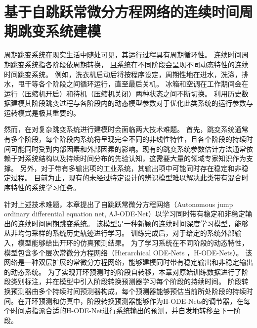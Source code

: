 
\chapter{基于自跳跃常微分方程网络的连续时间周期跳变系统建模}
周期跳变系统在现实生活中随处可见，其运行过程具有周期循环性。
连续时间周期跳变系统指各阶段依周期转换，
且系统在不同阶段会呈现不同动态特性的连续时间跳变系统。
例如，洗衣机启动后将按程序设定，周期性地在进水，洗涤，排水，甩干等各个阶段之间循环运行，直至最后关机。
冰箱和空调在工作期间会在运行（压缩机开启）和待机（压缩机关闭）两种状态之间不断切换。
利用历史数据建模其阶段跳变过程与各阶段内的动态模型参数对于优化此类系统的运行参数与运转模式是极其重要的。

然而，在对复杂跳变系统进行建模时会面临两大技术难题。
首先，跳变系统通常有多个阶段，每个阶段内系统将呈现完全不同的非线性特性，且各个阶段的持续时间可能同时受到内部因素和外部因素的影响\cite{WANG2022111790}。现有的跳变系统参数估计方法\cite{balenzuela2022parameter}通常依赖于对系统结构以及持续时间分布的先验认知，这需要大量的领域专家知识作为支撑。
另外，对于带有多输出项的工业系统，其输出项中可能同时存在稳定和非稳定过程\cite{nason2006stationary}。
目前为止，现有的未经过特定设计的辨识模型难以解决此类带有混合时序特性的系统学习任务。

针对上述技术难题，本章提出了自跳跃常微分方程网络（Autonomous jump ordinary differential equation net, AJ-ODE-Net）以学习同时带有稳定和非稳定输出的连续时间周期跳变系统。
该模型是一种新颖的连续时间深度学习模型，能够从非均匀采样的系统历史轨迹进行学习。
训练完成后，对于给定的系统外部输入，模型能够给出开环的仿真预测结果。
为了学习系统在不同阶段的动态特性，模型包含多个层次常微分方程网络（Hierarchical ODE-Nets ，H-ODE-Nets）。
该网络是一种双层扩展的常微分方程网络，能够建模同时带有稳定输出和非稳定输出的动态系统。
为了实现开环预测时的阶段自转移，本章对原始训练数据进行了阶段类别标注，并在模型中引入阶段转换预测器学习每个阶段的持续时间。
阶段转换预测器由多个持续时间预测器构成，每个预测器能够预估当前所处阶段的持续时间。在开环预测和仿真中，阶段转换预测器能够作为H-ODE-Nets的调节器，在每个时间点指派合适的H-ODE-Net进行系统输出的预测，并自发地转移至下一阶段。

